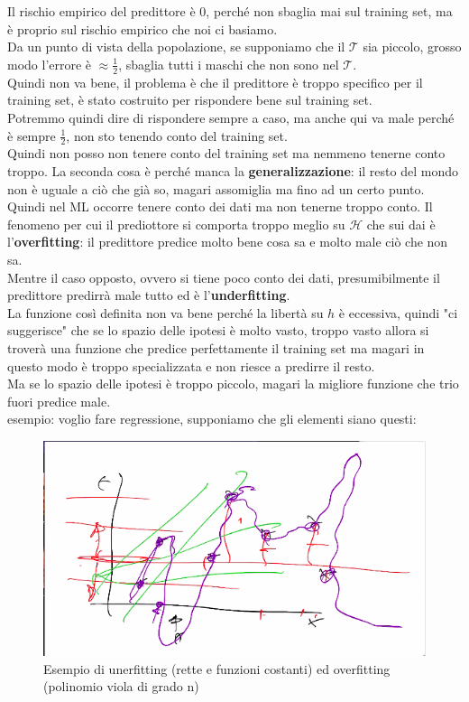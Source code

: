 \documentclass[12pt, oneside]{extbook}
\begin{document}
\\\\Il rischio empirico del predittore è 0, perché non sbaglia mai sul training set, ma è proprio sul rischio empirico che noi ci basiamo.\\Da un punto di vista della popolazione, se supponiamo che il $\mathscr{T}$ sia piccolo, grosso modo l'errore è $\approx \frac{1}{2}$, sbaglia tutti i maschi che non sono nel $\mathscr{T}$.\\Quindi non va bene, il problema è che il predittore è troppo specifico per il training set, è stato costruito per rispondere bene sul training set.\\Potremmo quindi dire di rispondere sempre a caso, ma anche qui va male perché è sempre $\frac{1}{2}$, non sto tenendo conto del training set.\\Quindi non posso non tenere conto del training set ma nemmeno tenerne conto troppo. La seconda cosa è perché manca la \textbf{generalizzazione}: il resto del mondo non è uguale a ciò che già so, magari assomiglia ma fino ad un certo punto.\\Quindi nel ML occorre tenere conto dei dati ma non tenerne troppo conto. Il fenomeno per cui il prediottore si comporta troppo meglio su $\mathscr{H}$ che sui dai è l'\textbf{overfitting}: il predittore predice molto bene cosa sa e molto male ciò che non sa.\\Mentre il caso opposto, ovvero si tiene poco conto dei dati, presumibilmente il predittore predirrà male tutto ed è l'\textbf{underfitting}.\\La funzione così definita non va bene perché la libertà su $h$ è eccessiva, quindi "ci suggerisce" che se lo spazio delle ipotesi è molto vasto, troppo vasto allora si troverà una funzione che predice perfettamente il training set ma magari in questo modo è troppo specializzata e non riesce a predirre il resto.\\Ma se lo spazio delle ipotesi è troppo piccolo, magari la migliore funzione che trio fuori predice male.\\esempio: voglio fare regressione, supponiamo che gli elementi siano questi:\\
\begin{figure}
	\includegraphics[scale=0.5]{immagini/under_over_fitt.png}
	\caption{Esempio di unerfitting (rette e funzioni costanti) ed overfitting (polinomio viola di grado n)}
\end{figure}\\\\
\end{document}
